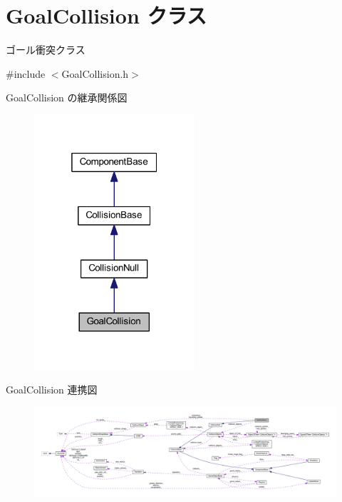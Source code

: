\hypertarget{class_goal_collision}{}\section{Goal\+Collision クラス}
\label{class_goal_collision}


ゴール衝突クラス  




{\ttfamily \#include $<$Goal\+Collision.\+h$>$}



Goal\+Collision の継承関係図\nopagebreak
\begin{figure}[H]
\begin{center}
\leavevmode
\includegraphics[width=169pt]{class_goal_collision__inherit__graph}
\end{center}
\end{figure}


Goal\+Collision 連携図\nopagebreak
\begin{figure}[H]
\begin{center}
\leavevmode
\includegraphics[width=350pt]{class_goal_collision__coll__graph}
\end{center}
\end{figure}
